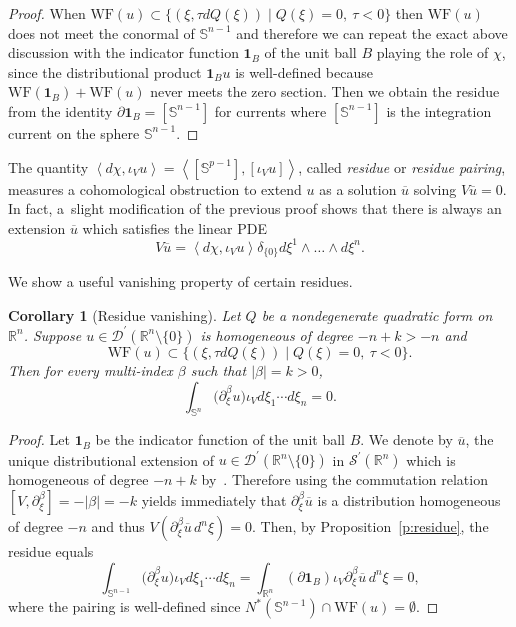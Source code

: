 \documentclass[JEP,XML,SOM,Unicode]{cedram}
\let\pazocal\mathscr
\newtheorem{corollary}[theorem]{Corollary}
\theoremstyle{definition}
\let\st\mid
\let\Feuler V
\let\exd u
\newcommand{\one}{\boldsymbol{1}}
\newcommand\wf{\mathrm{WF}}
\renewcommand{\boxed}[1]{#1}
\begin{document}
\begin{proof}
When $\wf(\exd)\subset \{(\xi,\tau dQ(\xi)) \st Q(\xi)=0, \ \tau<0\}$ then $\wf(\exd)$ does not meet the conormal of $\mathbb{S}^{n-1}$
and therefore we can repeat the exact above discussion with the indicator function $\one_B$ of the unit ball $B$ playing the role of $\chi$,
since the distributional product $\one_B \exd$ is well-defined because $\wf(\one_B)+ \wf(\exd)$ never meets the zero section.
Then we obtain the residue from the identity $\partial \one_B=[\mathbb{S}^{n-1}]$ for currents
where $[\mathbb{S}^{n-1}]$ is the integration current on the sphere $\mathbb{S}^{n-1}$.
\end{proof}

The quantity $\left\langle d\chi, \iota_\Feuler \exd \right\rangle=\left\langle [\mathbb{S}^{p-1}],[\iota_\Feuler \exd] \right\rangle$,
called \emph{residue} or \emph{residue pairing}, measures a cohomological obstruction to extend $\exd$ as a solution $\overline{\exd}$ solving $\Feuler \overline{\exd}=0$.
In fact, a~slight modification of the previous proof shows that there is always an
extension $\overline{\exd}$ which satisfies the linear PDE
\[
\boxed{\Feuler \overline{\exd}=\left\langle d\chi, \iota_\Feuler \exd \right\rangle \delta_{\{0\}} d\xi^1\wedge \dots\wedge d\xi^n.}
\]

We show a useful vanishing {property} of {certain} residues.

\begin{corollary}[{Residue vanishing}]\label{l:vanishing1}
Let $Q$ be a nondegenerate quadratic form on~$\mathbb{R}^n$.
Suppose $\exd\in \pazocal{D}^\prime(\mathbb{R}^n\setminus \{0\})$ is homogeneous of degree $-n+k>-n$ and
\[
\wf(\exd)\subset \{(\xi,\tau dQ(\xi)) \st Q(\xi)=0, \ \tau<0\}.
\]
Then for every
multi-index $\beta$ such that $\vert\beta\vert=k>0$,
\[
\int_{\mathbb{S}^n} \big(\partial_{\xi}^\beta \exd\big) \iota_\Feuler d\xi_1\cdots d\xi_n =0.
\]
\end{corollary}
\begin{proof}
Let $\one_B$ be the indicator function of the unit ball $B$. We denote by $\overline{\exd}$, the unique distributional extension of $\exd\in \pazocal{D}^\prime(\mathbb{R}^n\setminus \{0\})$ in $\pazocal{S}^\prime(\mathbb{R}^n)$ which is homogeneous of degree $-n+k$ by~\cite[Th.\,3.2.3, p.\,75]{H}.
Therefore using the commutation relation $[\Feuler,\partial_\xi^\beta]=-\vert\beta\vert=-k$ yields immediately
that $\partial_\xi^\beta \overline{\exd}$ is a distribution
homogeneous of degree $-n$ and thus $\Feuler(\partial_\xi^\beta \overline{\exd}\,d^n\xi)=0$.
Then, by Proposition~\ref{p:residue}, the residue equals
\[
\int_{\mathbb{S}^{n-1}} \big(\partial_{\xi}^\beta \exd\big) \iota_\Feuler d\xi_1\cdots d\xi_n=\int_{\mathbb{R}^n} \left(\partial \one_B\right) \iota_\Feuler \partial_\xi^\beta \overline{\exd}\,d^n\xi=0,
\]
where the pairing is well-defined since $N^*(\mathbb{S}^{n-1})\cap \wf(\exd)=\emptyset$.
\end{proof}
\end{document}
